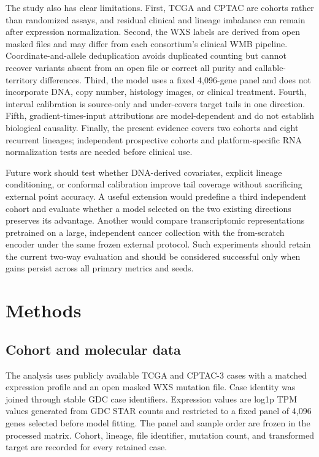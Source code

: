 \documentclass[11pt]{article}
\begin{document}
The study also has clear limitations. First, TCGA and CPTAC are cohorts rather than randomized assays, and residual clinical and lineage imbalance can remain after expression normalization. Second, the WXS labels are derived from open masked files and may differ from each consortium's clinical WMB pipeline. Coordinate-and-allele deduplication avoids duplicated counting but cannot recover variants absent from an open file or correct all purity and callable-territory differences. Third, the model uses a fixed 4,096-gene panel and does not incorporate DNA, copy number, histology images, or clinical treatment. Fourth, interval calibration is source-only and under-covers target tails in one direction. Fifth, gradient-times-input attributions are model-dependent and do not establish biological causality. Finally, the present evidence covers two cohorts and eight recurrent lineages; independent prospective cohorts and platform-specific RNA normalization tests are needed before clinical use.

Future work should test whether DNA-derived covariates, explicit lineage conditioning, or conformal calibration improve tail coverage without sacrificing external point accuracy. A useful extension would predefine a third independent cohort and evaluate whether a model selected on the two existing directions preserves its advantage. Another would compare transcriptomic representations pretrained on a large, independent cancer collection with the from-scratch encoder under the same frozen external protocol. Such experiments should retain the current two-way evaluation and should be considered successful only when gains persist across all primary metrics and seeds.

\section{Methods}
\subsection{Cohort and molecular data}
The analysis uses publicly available TCGA and CPTAC-3 cases with a matched expression profile and an open masked WXS mutation file. Case identity was joined through stable GDC case identifiers. Expression values are log1p TPM values generated from GDC STAR counts and restricted to a fixed panel of 4,096 genes selected before model fitting. The panel and sample order are frozen in the processed matrix. Cohort, lineage, file identifier, mutation count, and transformed target are recorded for every retained case.
\end{document}
